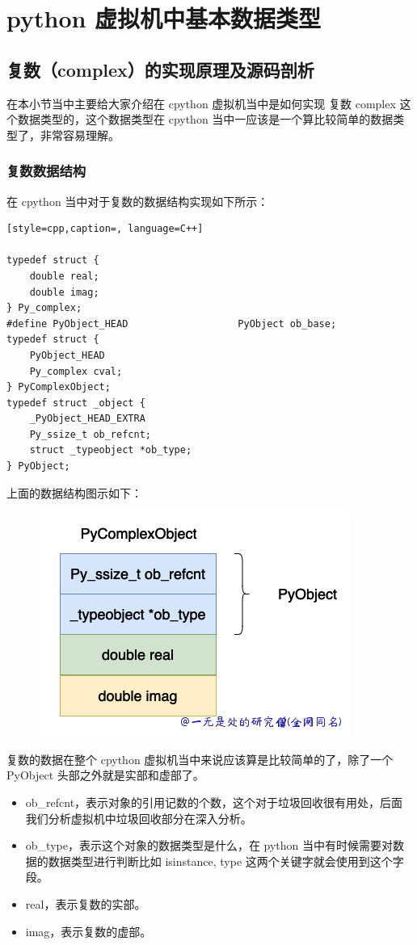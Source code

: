 \chapter{python 虚拟机中基本数据类型}
\section{复数（complex）的实现原理及源码剖析}
在本小节当中主要给大家介绍在 cpython 虚拟机当中是如何实现 复数 complex 这个数据类型的，这个数据类型在 cpython 当中一应该是一个算比较简单的数据类型了，非常容易理解。
\subsection{复数数据结构}
在 cpython 当中对于复数的数据结构实现如下所示：
\begin{lstlisting}[style=cpp,caption=, language=C++]

typedef struct {
    double real;
    double imag;
} Py_complex;
#define PyObject_HEAD                   PyObject ob_base;
typedef struct {
    PyObject_HEAD
    Py_complex cval;
} PyComplexObject;
typedef struct _object {
    _PyObject_HEAD_EXTRA
    Py_ssize_t ob_refcnt;
    struct _typeobject *ob_type;
} PyObject;
\end{lstlisting}
上面的数据结构图示如下：

    \begin{figure}[H]
        \centering
            \includegraphics[scale=.5]{images/23-int.png}
            \caption{ }
        \label{fig:my_label}
    \end{figure}
    
复数的数据在整个 cpython 虚拟机当中来说应该算是比较简单的了，除了一个 PyObject 头部之外就是实部和虚部了。
\begin{itemize}
\item ob\_refcnt，表示对象的引用记数的个数，这个对于垃圾回收很有用处，后面我们分析虚拟机中垃圾回收部分在深入分析。 
\item ob\_type，表示这个对象的数据类型是什么，在 python 当中有时候需要对数据的数据类型进行判断比如 isinstance, type 这两个关键字就会使用到这个字段。 
\item real，表示复数的实部。 
\item imag，表示复数的虚部。 
\end{itemize}
